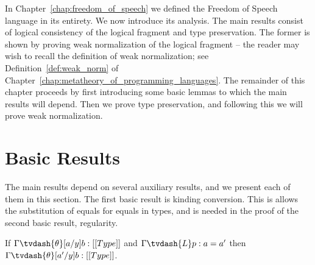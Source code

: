 In Chapter~\ref{chap:freedom_of_speech} we defined the Freedom of
Speech language in its entirety.  We now introduce its analysis.  The
main results consist of logical consistency of the logical fragment
and type preservation.  The former is shown by proving weak
normalization of the logical fragment -- the reader may wish to recall
the definition of weak normalization; see
Definition~\ref{def:weak_norm} of
Chapter~\ref{chap:metatheory_of_programming_languages}.  The remainder
of this chapter proceeds by first introducing some basic lemmas to
which the main results will depend.  Then we prove type preservation,
and following this we will prove weak normalization.

\section{Basic Results}
\label{sec:basic_results}
The main results depend on several auxiliary results, and we present
each of them in this section.  The first basic result is kinding
conversion.  This is allows the substitution of equals for equals in
types, and is needed in the proof of the second basic result,
regularity.
\begin{lemma}
  \label{lemma:kinding_conversion}
  If $\Gamma \tvdash{\theta} [a/y]b:[[Type]]$ and $\Gamma \tvdash{L} p:a = a'$ then
  $\Gamma \tvdash{\theta} [a'/y]b:[[Type]]$.
\end{lemma}
